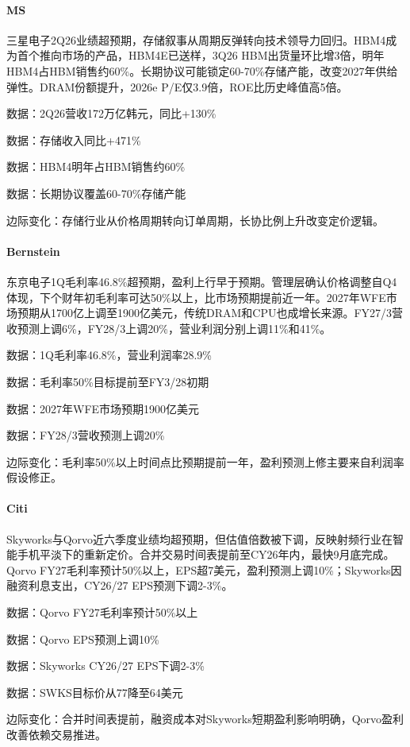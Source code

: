 \documentclass[11pt]{ctexart}
\begin{document}
\paragraph{MS} 三星电子2Q26业绩超预期，存储叙事从周期反弹转向技术领导力回归。HBM4成为首个推向市场的产品，HBM4E已送样，3Q26 HBM出货量环比增3倍，明年HBM4占HBM销售约60\%。长期协议可能锁定60-70\%存储产能，改变2027年供给弹性。DRAM份额提升，2026e P/E仅3.9倍，ROE比历史峰值高5倍。
{\small\color{refgray}数据：2Q26营收172万亿韩元，同比+130\%\par}
{\small\color{refgray}数据：存储收入同比+471\%\par}
{\small\color{refgray}数据：HBM4明年占HBM销售约60\%\par}
{\small\color{refgray}数据：长期协议覆盖60-70\%存储产能\par}
{\small\color{refgray}边际变化：存储行业从价格周期转向订单周期，长协比例上升改变定价逻辑。\par}
\paragraph{Bernstein} 东京电子1Q毛利率46.8\%超预期，盈利上行早于预期。管理层确认价格调整自Q4体现，下个财年初毛利率可达50\%以上，比市场预期提前近一年。2027年WFE市场预期从1700亿上调至1900亿美元，传统DRAM和CPU也成增长来源。FY27/3营收预测上调6\%，FY28/3上调20\%，营业利润分别上调11\%和41\%。
{\small\color{refgray}数据：1Q毛利率46.8\%，营业利润率28.9\%\par}
{\small\color{refgray}数据：毛利率50\%目标提前至FY3/28初期\par}
{\small\color{refgray}数据：2027年WFE市场预期1900亿美元\par}
{\small\color{refgray}数据：FY28/3营收预测上调20\%\par}
{\small\color{refgray}边际变化：毛利率50\%以上时间点比预期提前一年，盈利预测上修主要来自利润率假设修正。\par}
\paragraph{Citi} Skyworks与Qorvo近六季度业绩均超预期，但估值倍数被下调，反映射频行业在智能手机平淡下的重新定价。合并交易时间表提前至CY26年内，最快9月底完成。Qorvo FY27毛利率预计50\%以上，EPS超7美元，盈利预测上调10\%；Skyworks因融资利息支出，CY26/27 EPS预测下调2-3\%。
{\small\color{refgray}数据：Qorvo FY27毛利率预计50\%以上\par}
{\small\color{refgray}数据：Qorvo EPS预测上调10\%\par}
{\small\color{refgray}数据：Skyworks CY26/27 EPS下调2-3\%\par}
{\small\color{refgray}数据：SWKS目标价从77降至64美元\par}
{\small\color{refgray}边际变化：合并时间表提前，融资成本对Skyworks短期盈利影响明确，Qorvo盈利改善依赖交易推进。\par}
\end{document}
